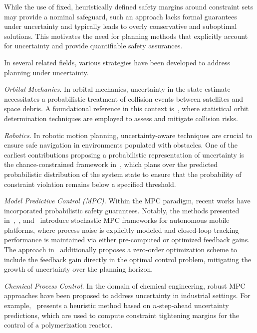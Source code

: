 While the use of fixed, heuristically defined safety margins around constraint sets may provide a nominal safeguard, such an approach lacks formal guarantees under uncertainty and typically leads to overly conservative and suboptimal solutions. This motivates the need for planning methods that explicitly account for uncertainty and provide quantifiable safety assurances.

In several related fields, various strategies have been developed to address planning under uncertainty.

\textit{Orbital Mechanics.} In orbital mechanics, uncertainty in the state estimate necessitates a probabilistic treatment of collision events between satellites and space debris. A foundational reference in this context is~\cite{Tapley:StatisticalOrbitDetermination:2004}, where statistical orbit determination techniques are employed to assess and mitigate collision risks.

\textit{Robotics.} In robotic motion planning, uncertainty-aware techniques are crucial to ensure safe navigation in environments populated with obstacles. One of the earliest contributions proposing a probabilistic representation of uncertainty is the chance-constrained framework in~\cite{Blackmore:ChanceConstrainedOptimalPath:2011}, which plans over the predicted probabilistic distribution of the system state to ensure that the probability of constraint violation remains below a specified threshold.

\textit{Model Predictive Control (MPC).} Within the MPC paradigm, recent works have incorporated probabilistic safety guarantees. Notably, the methods presented in~\cite{Gao:CollisionfreeMotionPlanning:2023},~\cite{Zhang:RobustifiedTimeoptimalPointtopoint:2025}, and~\cite{Zhang:RobustifiedTimeoptimalCollisionfree:2024} introduce stochastic MPC frameworks for autonomous mobile platforms, where process noise is explicitly modeled and closed-loop tracking performance is maintained via either pre-computed or optimized feedback gains. The approach in~\cite{Gao:CollisionfreeMotionPlanning:2023} additionally proposes a zero-order optimization scheme to include the feedback gain directly in the optimal control problem, mitigating the growth of uncertainty over the planning horizon.

\textit{Chemical Process Control.} In the domain of chemical engineering, robust MPC approaches have been proposed to address uncertainty in industrial settings. For example,~\cite{Krog:SimpleFastRobust:2024} presents a heuristic method based on $n$-step-ahead uncertainty predictions, which are used to compute constraint tightening margins for the control of a polymerization reactor.

